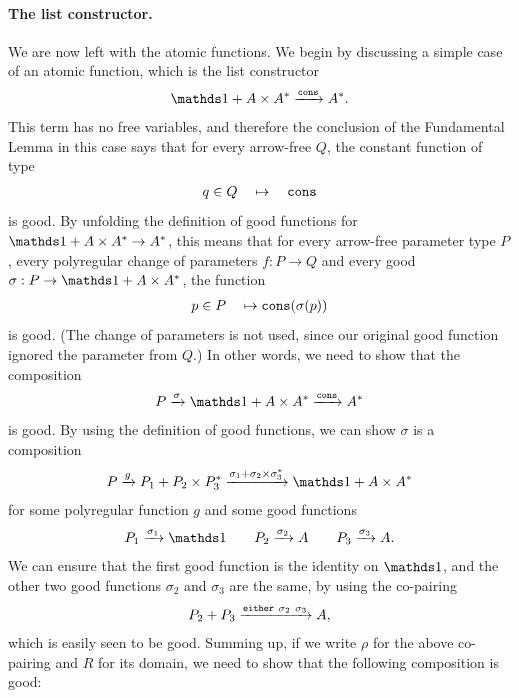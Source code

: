 \paragraph*{The list constructor.}  We are now left with the atomic functions. We begin by discussing a simple case of an atomic function, which is the list constructor
\begin{align*}
\onetype + A \times A^* \xrightarrow \consterm A^*.
\end{align*}
This term has no free variables, and therefore the conclusion of the Fundamental Lemma in this case says that for every arrow-free $Q$, the constant function  of type
\begin{align*}
q \in Q \quad \mapsto \quad \mathtt{cons} 
\end{align*}
is good. By unfolding the definition of good functions for  $\onetype + A \times A^* \to A^*$, this means that for every arrow-free parameter type $P$, every polyregular change of parameters $f : P \to Q$ and every good $\sigma : P \to \onetype + A \times A^*$, 
the function 
\begin{align*}
p \in P \quad \mapsto \mathtt{cons} (\sigma(p))
\end{align*}
is good. (The change of parameters is not used, since our original good function ignored the parameter from $Q$.) In other words, we need to show that the composition 
\begin{align*}
P \xrightarrow \sigma \onetype + A \times A^* \xrightarrow \consterm A^*
\end{align*}
is good. By using the definition of good functions, we can show $\sigma$ is a composition
\begin{align*}
P \xrightarrow g  P_1 + P_2 \times P_3^* \xrightarrow { \sigma_1 + \sigma_2 \times \sigma_3^*} \onetype + A \times A^* 
\end{align*}
for some polyregular function $g$ and some  good functions 
\begin{align*}
P_1 \xrightarrow {\sigma_1} \onetype \qquad 
P_2 \xrightarrow {\sigma_2} A \qquad 
P_3 \xrightarrow {\sigma_3} A.
\end{align*}
We can ensure that the first good function is the identity on $\onetype$, and the other two good functions $\sigma_2$ and $\sigma_3$ are the same,  by using the co-pairing 
\begin{align*}
P_2 + P_3 \xrightarrow {\mathtt{either}\ \sigma_2\ \sigma_3} A,
\end{align*}
which is easily seen to be good. Summing up, if we write $\rho$ for the above co-pairing and $R$ for its domain, we need to show that the following composition is good:
